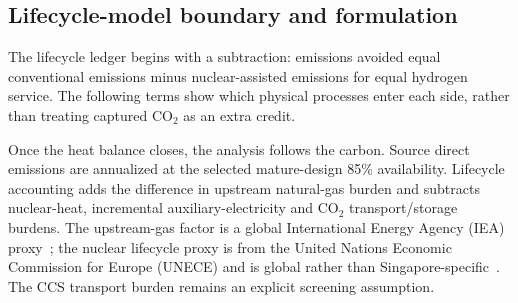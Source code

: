 \subsection{Lifecycle-model boundary and formulation}

The lifecycle ledger begins with a subtraction: emissions avoided equal conventional emissions minus nuclear-assisted emissions for equal hydrogen service. The following terms show which physical processes enter each side, rather than treating captured CO$_2$ as an extra credit.

Once the heat balance closes, the analysis follows the carbon. Source direct emissions are annualized at the selected mature-design 85\% availability. Lifecycle accounting adds the difference in upstream natural-gas burden and subtracts nuclear-heat, incremental auxiliary-electricity and CO$_2$ transport/storage burdens. The upstream-gas factor is a global International Energy Agency (IEA) proxy~\cite{iea2026lng}; the nuclear lifecycle proxy is from the United Nations Economic Commission for Europe (UNECE) and is global rather than Singapore-specific~\cite{unece2022lca}. The CCS transport burden remains an explicit screening assumption.

